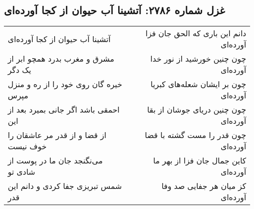 \begin{center}
\section*{غزل شماره ۲۷۸۶: آتشینا آب حیوان از کجا آورده‌ای}
\label{sec:2786}
\begin{longtable}{l p{0.5cm} r}
آتشینا آب حیوان از کجا آورده‌ای
&&
دانم این باری که الحق جان فزا آورده‌ای
\\
مشرق و مغرب بدرد همچو ابر از یک دگر
&&
چون چنین خورشید از نور خدا آورده‌ای
\\
خیره گان روی خود را از ره و منزل مپرس
&&
چون بر ایشان شعله‌های کبریا آورده‌ای
\\
احمقی باشد اگر جانی بمیرد بعد از این
&&
چون چنین دریای جوشان از بقا آورده‌ای
\\
از قضا و از قدر مر عاشقان را خوف نیست
&&
چون قدر را مست گشته با قضا آورده‌ای
\\
می‌نگنجد جان ما در پوست از شادی تو
&&
کاین جمال جان فزا از بهر ما آورده‌ای
\\
شمس تبریزی جفا کردی و دانم این قدر
&&
کز میان هر جفایی صد وفا آورده‌ای
\\
\end{longtable}
\end{center}
